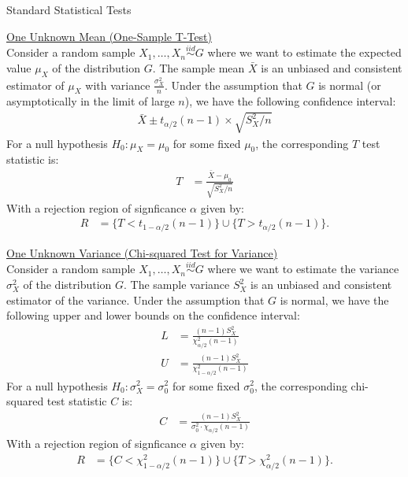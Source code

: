 \documentclass{tufte-handout}
\newcommand{\iid}{\stackrel{iid}{\sim}}
\begin{document}
\justify

{\LARGE Standard Statistical Tests}

\vspace*{18pt}

\noindent
\underline{One Unknown Mean (One-Sample T-Test)} \\
Consider a random sample $X_1, \ldots, X_n \iid G$ where we want to
estimate the expected value $\mu_X$ of the distribution $G$. The 
sample mean $\bar{X}$ is an unbiased and consistent estimator of
$\mu_X$ with variance $\frac{\sigma^2_X}{n}$. Under the assumption 
that $G$ is normal (or asymptotically in the limit of large $n$), we
have the following confidence interval:
\begin{align*}
\bar{X} \pm t_{\alpha/2}(n-1) \times \sqrt{S_X^2 / n}
\end{align*}
For a null hypothesis $H_0: \mu_X = \mu_0$ for some fixed $\mu_0$, the
corresponding $T$ test statistic is:
\begin{align*}
T &= \frac{\bar{X} - \mu_0}{\sqrt{S_X^2 / n}}
\end{align*}
With a rejection region of signficance $\alpha$ given by:
\begin{align*}
R &= \{ T < t_{1-\alpha/2}(n-1) \} \cup \{ T > t_{\alpha/2}(n-1) \}. 
\end{align*}

\vspace*{24pt}

\noindent
\underline{One Unknown Variance (Chi-squared Test for Variance)} \\
Consider a random sample $X_1, \ldots, X_n \iid G$ where we want to
estimate the variance $\sigma^2_X$ of the distribution $G$. The 
sample variance $S_X^2$ is an unbiased and consistent estimator of
the variance. Under the assumption that $G$ is normal, we
have the following upper and lower bounds on the confidence interval:
\begin{align*}
L &= \frac{(n-1)S^2_X}{\chi^2_{\alpha/2}(n-1)} \\
U &= \frac{(n-1)S^2_X}{\chi^2_{1 - \alpha/2}(n-1)}
\end{align*}
For a null hypothesis $H_0: \sigma^2_X = \sigma^2_0$ for some
fixed $\sigma^2_0$, the corresponding chi-squared test statistic $C$ is:
\begin{align*}
C &= \frac{(n-1)S^2_X}{\sigma^2_0 \cdot \chi_{\alpha/2}(n-1)}
\end{align*}
With a rejection region of signficance $\alpha$ given by:
\begin{align*}
R &= \{ C < \chi^2_{1-\alpha/2}(n-1) \} \cup \{ T > \chi^2_{\alpha/2}(n-1) \}. 
\end{align*}
\end{document}
